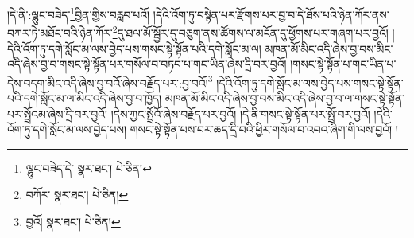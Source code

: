 །དེ་ནི་:ལྷུང་བཟེད་\footnote{ལྷུང་བཟེད་དེ་  སྣར་ཐང་།  པེ་ཅིན། }བྱིན་གྱིས་བརླབ་པའོ། །དེའི་འོག་ཏུ་བསྙེན་པར་རྫོགས་པར་བྱ་བ་དེ་ཐོས་པའི་ཉེན་ཀོར་ནས་བཀར་ཏེ་མཐོང་བའི་ཉེན་ཀོར་\footnote{བཀོར་  སྣར་ཐང་།  པེ་ཅིན། }དུ་ཐལ་མོ་སྦྱོར་དུ་བཅུག་ནས་ཚོགས་ལ་མངོན་དུ་ཕྱོགས་པར་གཞག་པར་བྱའོ། །དེའི་འོག་ཏུ་དགེ་སློང་མ་ལས་བྱེད་པས་གསང་སྟེ་སྟོན་པའི་དགེ་སློང་མ་ལ། མཁན་མོ་མིང་འདི་ཞེས་བྱ་བས་མིང་འདི་ཞེས་བྱ་བ་གསང་སྟེ་སྟོན་པར་གསོལ་བ་བཏབ་པ་གང་ཡིན་ཞེས་དྲི་བར་བྱའོ། །གསང་སྟེ་སྟོན་པ་གང་ཡིན་པ་དེས་བདག་མིང་འདི་ཞེས་བྱ་བའོ་ཞེས་བརྗོད་པར་:བྱ་བའོ།\footnote{བྱའོ།  སྣར་ཐང་།  པེ་ཅིན། } །དེའི་འོག་ཏུ་དགེ་སློང་མ་ལས་བྱེད་པས་གསང་སྟེ་སྟོན་པའི་དགེ་སློང་མ་ལ་མིང་འདི་ཞེས་བྱ་བ་ཁྱོད། མཁན་མོ་མིང་འདི་ཞེས་བྱ་བས་མིང་འདི་ཞེས་བྱ་བ་ལ་གསང་སྟེ་སྟོན་པར་སྤྲོའམ་ཞེས་དྲི་བར་བྱའོ། །དེས་ཀྱང་སྤྲོའོ་ཞེས་བརྗོད་པར་བྱའོ། །དེ་ནི་གསང་སྟེ་སྟོན་པར་སྤྲོ་བར་བྱའོ། །དེའི་འོག་ཏུ་དགེ་སློང་མ་ལས་བྱེད་པས། གསང་སྟེ་སྟོན་པས་བར་ཆད་དྲི་བའི་ཕྱིར་གསོལ་བ་འབའ་ཞིག་གི་ལས་བྱའོ། །

